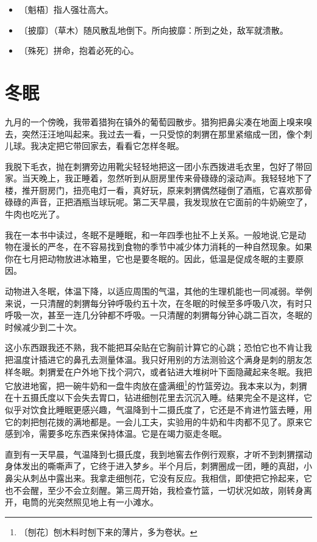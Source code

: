 \documentclass[12pt,UTF-8,openany]{ctexbook}
\begin{document}
\begin{itemize}
    \setlength\itemsep{-0.2em}
    \item 〔魁梧〕指人强壮高大。
    \item 〔披靡〕（草木）随风散乱地倒下。所向披靡：所到之处，敌军就溃散。
    \item 〔殊死〕拼命，抱着必死的心。
\end{itemize}

\chapter{冬眠}

\begin{Large}
    
    九月的一个傍晚，我带着猎狗在镇外的葡萄园散步。猎狗把鼻尖凑在地面上嗅来嗅去，突然汪汪地叫起来。我过去一看，一只受惊的刺猬在那里紧缩成一团，像个刺儿球。我决定把它带回家去，看看它怎样冬眠。
    
    我脱下毛衣，抛在刺猬旁边用靴尖轻轻地把这一团小东西拨进毛衣里，包好了带回家。当天晚上，我正睡着，忽然听到从厨房里传来骨碌碌的滚动声。我轻轻地下了楼，推开厨房门，扭亮电灯一看，真好玩，原来刺猬偶然碰倒了酒瓶，它喜欢那骨碌碌的声音，正把酒瓶当球玩呢。第二天早晨，我发现放在它面前的牛奶碗空了，牛肉也吃光了。
    
    我在一本书中读过，冬眠不是睡眠，和一年四季也扯不上关系。一般地说,它是动物在漫长的严冬，在不容易找到食物的季节中减少体力消耗的一种自然现象。如果你在七月把动物放进冰箱里，它也是要冬眠的。因此，低温是促成冬眠的主要原因。
    
    动物进入冬眠，体温下降，以适应周围的气温，其他的生理机能也一同减弱。举例来说，一只清醒的刺猬每分钟呼吸约五十次，在冬眠的时候至多呼吸八次，有时只呼吸一次，甚至一连几分钟都不呼吸。一只清醒的刺猬每分钟心跳二百次，冬眠的时候减少到二十次。
    
    这小东西跟我还不熟，我不能把耳朵贴在它胸前计算它的心跳；恐怕它也不肯让我把温度计插进它的鼻孔去测量体温。我只好用别的方法测验这个满身是刺的朋友怎样冬眠。刺猬爱在户外地下找个洞穴，或者钻进大堆树叶下面隐藏起来冬眠。我把它放进地窖，把一碗牛奶和一盘牛肉放在盛满细\footnote{〔刨花〕刨木料时刨下来的薄片，多为卷状。}的竹篮旁边。我本来以为，刺猬在十五摄氏度以下会失去胃口，钻进细刨花里去沉沉入睡。结果完全不是这样，它似乎对饮食比睡眠更感兴趣，气温降到十二摄氏度了，它还是不肯进竹篮去睡，用它的刺把刨花拨的满地都是。一会儿工夫，实验用的牛奶和牛肉都不见了。原来它感到冷，需要多吃东西来保持体温。它是在竭力驱走冬眠。
    
    直到有一天早晨，气温降到七摄氏度，我到地窖去作例行观察，才听不到刺猬摆动身体发出的嘶嘶声了，它终于进入梦乡。半个月后，刺猬圈成一团，睡的真甜，小鼻尖从刺丛中露出来。我拿走细刨花，它没有反应。我相信，即使把它拎起来，它也不会醒，至少不会立刻醒。第三周开始，我检查竹篮，一切状况如故，刚转身离开，电筒的光突然照见地上有一小滩水。
    

\end{Large}
\end{document}
